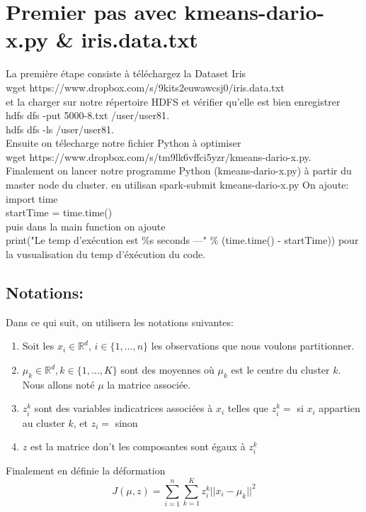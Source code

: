 \documentclass[12pt]{article}
\numberwithin{equation}{section}
\theoremstyle{plain}
\def\no{\noindent}
\def\R{\mathbb{R}}
\def\no{\noindent}
\begin{document}
\section{Premier pas avec  kmeans-dario-x.py \& iris.data.txt}
\no
La première étape consiste à téléchargez la Dataset Iris\\ {\color{blue} wget https://www.dropbox.com/s/9kits2euwawcsj0/iris.data.txt}\\ \no et la charger sur notre répertoire HDFS et vérifier qu'elle est bien enregistrer\\ {\color{blue} hdfs dfs -put 5000-8.txt /user/user81}.\\ 
{ \color{blue} hdfs dfs -ls /user/user81}.\\
Ensuite on télecharge notre fichier Python à optimiser \\
{\color{blue}wget https://www.dropbox.com/s/tm9lk6vffci5yzr/kmeans-dario-x.py}.\\
Finalement on lancer notre programme Python (kmeans-dario-x.py)  à partir du master node du cluster. en utilisan 
{\color{blue}spark-submit kmeans-dario-x.py}
On ajoute: \\
{\color{blue} import time \\
startTime = time.time()
} \\
puis dans la main function on ajoute\\
{\color{blue}print("Le temp d'exécution est \%s seconds ---" \% (time.time() - startTime))
}
 pour la vusualisation du temp d'éxécution du code.
\subsection{Notations:}
Dans ce qui suit, on utilisera les notations suivantes:
\begin{enumerate}
\item Soit les $x_i\in\R^d$, $i\in\{1,\ldots, n\}$ les observations que nous voulons partitionner.
\item $\mu_k \in\R^d, k\in\{1,\ldots , K\}$ sont des  moyennes où $\mu_k$ est le centre du cluster $k$. Nous allons
noté $\mu$ la matrice associée.
\item $z_i^k $ sont des variables indicatrices associées à $x_i$ telles que $z_i^k = $  si $x_i$ appartien au cluster $k$, et $z_i=$ sinon
\item $z$ est la matrice don't les composantes sont égaux à $z_i^k$
\end{enumerate}
Finalement en définie la déformation $$J(\mu , z )= \sum_{i=1}^{n}\sum_{k=1}^{K} z_i^k ||x_i - \mu_k||
^2$$
\end{document}
